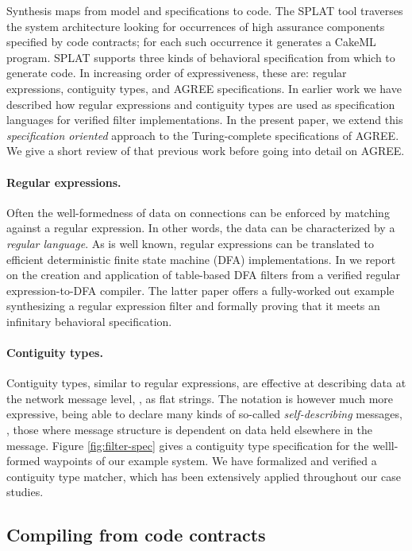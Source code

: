 Synthesis maps from model and specifications to code. The SPLAT tool
traverses the system architecture looking for occurrences of high
assurance components specified by code contracts; for each such
occurrence it generates a CakeML program. SPLAT supports three kinds
of behavioral specification from which to generate code. In increasing
order of expressiveness, these are: regular expressions, contiguity
types, and AGREE specifications. In earlier work we have described how
regular expressions and contiguity types are used as specification
languages for verified filter implementations. In the present paper,
we extend this \emph{specification oriented} approach to the
Turing-complete specifications of AGREE.  We give a short review of
that previous work before going into detail on AGREE.

\paragraph{Regular expressions.} Often the well-formedness of data on connections
can be enforced by matching against a regular expression. In other
words, the data can be characterized by a \emph{regular language}. As
is well known, regular expressions can be translated to efficient
deterministic finite state machine (DFA)
implementations. In \cite{formal-filter-synth-langsec,case-verified-filter}
we report on the creation and application of table-based DFA filters
from a verified regular expression-to-DFA compiler. The latter paper
offers a fully-worked out example synthesizing a regular expression
filter and formally proving that it meets an infinitary behavioral
specification.

\paragraph{Contiguity types\cite{contiguity-types}.}
Contiguity types, similar to regular expressions, are effective at
describing data at the network message level, \eg, as flat
strings. The notation is however much more expressive, being able to
declare many kinds of so-called \emph{self-describing} messages, \ie,
those where message structure is dependent on data held elsewhere in
the message. Figure \ref{fig:filter-spec} gives a contiguity type
specification for the welll-formed waypoints of our example system. We
have formalized and verified a contiguity type matcher, which has been
extensively applied throughout our case studies.

\subsection{Compiling from code contracts}

